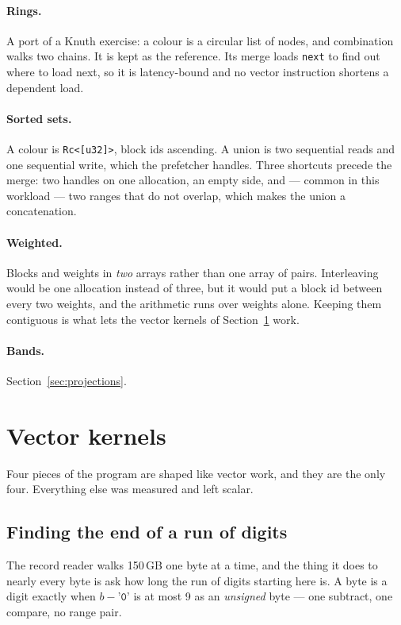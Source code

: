\documentclass[11pt,a4paper]{article}
\begin{document}
\paragraph{Rings.} A port of a Knuth exercise: a colour is a circular list of
nodes, and combination walks two chains. It is kept as the reference. Its merge
loads \texttt{next} to find out where to load next, so it is latency-bound and
no vector instruction shortens a dependent load.

\paragraph{Sorted sets.} A colour is \texttt{Rc<[u32]>}, block ids ascending. A
union is two sequential reads and one sequential write, which the prefetcher
handles. Three shortcuts precede the merge: two handles on one allocation, an
empty side, and --- common in this workload --- two ranges that do not overlap,
which makes the union a concatenation.

\paragraph{Weighted.} Blocks and weights in \emph{two} arrays rather than one
array of pairs. Interleaving would be one allocation instead of three, but it
would put a block id between every two weights, and the arithmetic runs over
weights alone. Keeping them contiguous is what lets the vector kernels of
Section~\ref{sec:simd} work.

\paragraph{Bands.} Section~\ref{sec:projections}.

\section{Vector kernels}
\label{sec:simd}

Four pieces of the program are shaped like vector work, and they are the only
four. Everything else was measured and left scalar.

\subsection{Finding the end of a run of digits}

The record reader walks 150\,GB one byte at a time, and the thing it does to
nearly every byte is ask how long the run of digits starting here is. A byte is
a digit exactly when $b - \texttt{'0'}$ is at most 9 as an \emph{unsigned} byte
--- one subtract, one compare, no range pair.
\end{document}
